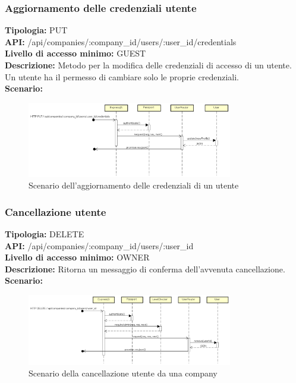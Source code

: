 \newpage
\subsubsection{Aggiornamento delle credenziali utente}
\textbf{Tipologia:} PUT \\
\textbf{API:} /api/companies/:company\_id/users/:user\_id/credentials \\
\textbf{Livello di accesso minimo:} GUEST \\
\textbf{Descrizione:} Metodo per la modifica delle credenziali di accesso di un utente. Un utente ha il permesso di cambiare solo le proprie credenziali. \\
\textbf{Scenario:} 
\begin{figure}[h]
\centering
\includegraphics[width=0.8\textwidth]{res/sections/backend/(PUT)credenzialiUtente.png}
\caption{Scenario dell'aggiornamento delle credenziali di un utente}
\end{figure}

\newpage
\subsubsection{Cancellazione utente}
\textbf{Tipologia:} DELETE \\
\textbf{API:} /api/companies/:company\_id/users/:user\_id \\
\textbf{Livello di accesso minimo:} OWNER \\
\textbf{Descrizione:} Ritorna un messaggio di conferma dell'avvenuta cancellazione. \\
\textbf{Scenario:} 
\begin{figure}[h]
\centering
\includegraphics[width=0.8\textwidth]{res/sections/backend/(DELETE)user.png}
\caption{Scenario della cancellazione utente da una company}
\end{figure}


